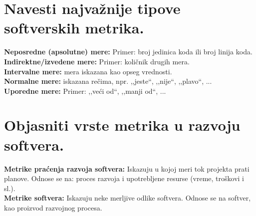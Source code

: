 \documentclass[a4paper]{article}
\begin{document}
\section{Navesti najvažnije tipove softverskih metrika.}
  \noindent \textbf{Neposredne (apsolutne) mere:} Primer: broj jedinica koda ili broj linija koda.\\
  \textbf{Indirektne/izvedene mere:} Primer: količnik drugih mera.\\
  \textbf{Intervalne mere:} mera iskazana kao opseg vrednosti.\\
  \textbf{Normalne mere:} iskazana rečima, npr. ,,jeste``, ,,nije``, ,,plavo``, ...\\
  \textbf{Uporedne mere:} Primer: ,,veći od``, ,,manji od``, ...
  
\section{Objasniti vrste metrika u razvoju softvera.}
  \noindent \textbf{Metrike praćenja razvoja softvera:} Iskazuju u kojoj meri tok projekta prati planove.
  Odnose se na: proces razvoja i upotrebljene resurse (vreme, troškovi i sl.).\\
  \textbf{Metrike softvera:} Iskazuju neke merljive odlike softvera. Odnose se 
  na softver, kao proizvod razvojnog procesa.
  
\end{document}
